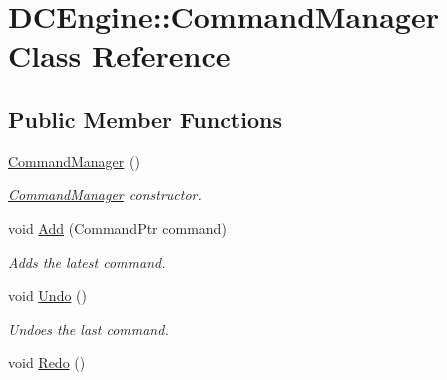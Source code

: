 \hypertarget{classDCEngine_1_1CommandManager}{\section{D\-C\-Engine\-:\-:Command\-Manager Class Reference}
\label{classDCEngine_1_1CommandManager}
}
\subsection*{Public Member Functions}
\begin{DoxyCompactItemize}
\item 
\hypertarget{classDCEngine_1_1CommandManager_ad3b0f61d5c1a06107f77d04b1b33d5a2}{\hyperlink{classDCEngine_1_1CommandManager_ad3b0f61d5c1a06107f77d04b1b33d5a2}{Command\-Manager} ()}\label{classDCEngine_1_1CommandManager_ad3b0f61d5c1a06107f77d04b1b33d5a2}

\begin{DoxyCompactList}\small\item\em \hyperlink{classDCEngine_1_1CommandManager}{Command\-Manager} constructor. \end{DoxyCompactList}\item 
void \hyperlink{classDCEngine_1_1CommandManager_a46efd76d37bc0754ec51aa835a810863}{Add} (Command\-Ptr command)
\begin{DoxyCompactList}\small\item\em Adds the latest command. \end{DoxyCompactList}\item 
\hypertarget{classDCEngine_1_1CommandManager_a67d0955255042f2185788896503da1ef}{void \hyperlink{classDCEngine_1_1CommandManager_a67d0955255042f2185788896503da1ef}{Undo} ()}\label{classDCEngine_1_1CommandManager_a67d0955255042f2185788896503da1ef}

\begin{DoxyCompactList}\small\item\em Undoes the last command. \end{DoxyCompactList}\item 
\hypertarget{classDCEngine_1_1CommandManager_afc5a4b8a89b9472bd2359cb023adc60a}{void \hyperlink{classDCEngine_1_1CommandManager_afc5a4b8a89b9472bd2359cb023adc60a}{Redo} ()}\label{classDCEngine_1_1CommandManager_afc5a4b8a89b9472bd2359cb023adc60a}


\end{DoxyCompactItemize}
